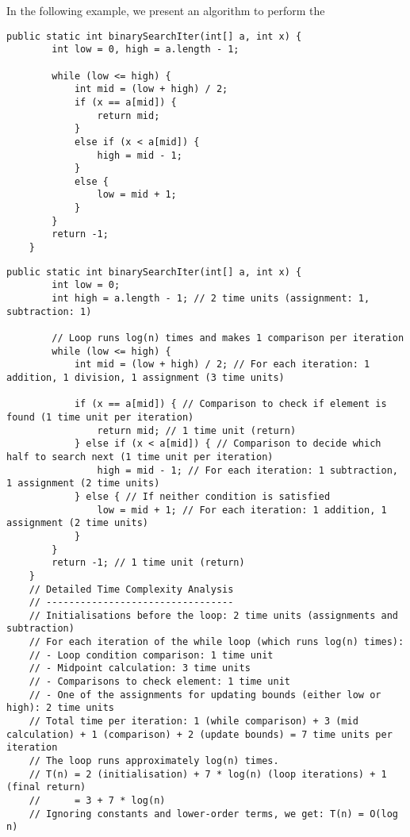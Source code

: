 \begin{example}

In the following example, we present an algorithm to perform the 

\begin{lstlisting}[style = javaStyle, caption={Binary Search Iterative}, label={lst:java_binary_search_none}]
    public static int binarySearchIter(int[] a, int x) {
        int low = 0, high = a.length - 1;

        while (low <= high) {
            int mid = (low + high) / 2;
            if (x == a[mid]) {
                return mid;
            } 
            else if (x < a[mid]) {
                high = mid - 1;
            } 
            else {
                low = mid + 1;
            }
        }
        return -1;
    }
\end{lstlisting}

\begin{lstlisting}[style=javaStyle, caption={Binary Search Iterative}, label={lst:java_binary_search}]
    public static int binarySearchIter(int[] a, int x) {
        int low = 0;
        int high = a.length - 1; // 2 time units (assignment: 1, subtraction: 1)

        // Loop runs log(n) times and makes 1 comparison per iteration
        while (low <= high) {
            int mid = (low + high) / 2; // For each iteration: 1 addition, 1 division, 1 assignment (3 time units)

            if (x == a[mid]) { // Comparison to check if element is found (1 time unit per iteration)
                return mid; // 1 time unit (return)
            } else if (x < a[mid]) { // Comparison to decide which half to search next (1 time unit per iteration)
                high = mid - 1; // For each iteration: 1 subtraction, 1 assignment (2 time units)
            } else { // If neither condition is satisfied
                low = mid + 1; // For each iteration: 1 addition, 1 assignment (2 time units)
            }
        }
        return -1; // 1 time unit (return)
    }
    // Detailed Time Complexity Analysis
    // ---------------------------------
    // Initialisations before the loop: 2 time units (assignments and subtraction)
    // For each iteration of the while loop (which runs log(n) times):
    // - Loop condition comparison: 1 time unit
    // - Midpoint calculation: 3 time units
    // - Comparisons to check element: 1 time unit
    // - One of the assignments for updating bounds (either low or high): 2 time units
    // Total time per iteration: 1 (while comparison) + 3 (mid calculation) + 1 (comparison) + 2 (update bounds) = 7 time units per iteration
    // The loop runs approximately log(n) times.
    // T(n) = 2 (initialisation) + 7 * log(n) (loop iterations) + 1 (final return)
    //      = 3 + 7 * log(n)
    // Ignoring constants and lower-order terms, we get: T(n) = O(log n)

\end{lstlisting}
    
\end{example}


